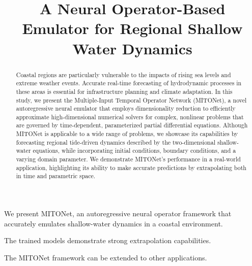 \documentclass[draft]{agujournal2019}
\begin{document}
\title{A Neural Operator-Based Emulator for Regional Shallow Water Dynamics}




\begin{keypoints}
\item We present MITONet, an autoregressive neural operator framework that accurately emulates shallow-water dynamics in a coastal environment.
\item The trained models demonstrate strong extrapolation capabilities.
\item The MITONet framework can be extended to other applications.
\end{keypoints}

\begin{abstract}
Coastal regions are particularly vulnerable to the impacts of rising sea levels and extreme weather events. Accurate real-time forecasting of hydrodynamic processes in these areas is essential for infrastructure planning and climate adaptation. In this study, we present the Multiple-Input Temporal Operator Network (MITONet), a novel autoregressive neural emulator that employs dimensionality reduction to efficiently approximate high-dimensional numerical solvers for complex, nonlinear problems that are governed by time-dependent, parameterized partial differential equations. Although MITONet is applicable to a wide range of problems, we showcase its capabilities by forecasting regional tide-driven dynamics described by the two-dimensional shallow-water equations, while incorporating initial conditions, boundary conditions, and a varying domain parameter. We demonstrate MITONet's performance in a real-world application, highlighting its ability to make accurate predictions by extrapolating both in time and parametric space.
\end{abstract}
\end{document}
